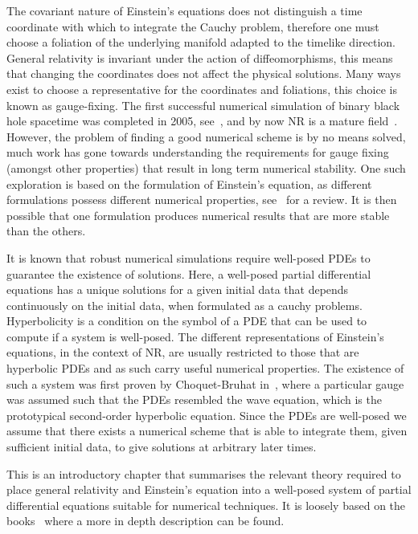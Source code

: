 \documentclass[10pt]{report}
\theoremstyle{definition}
\begin{document}
The covariant nature of Einstein's equations does not distinguish a time coordinate with which to integrate the Cauchy problem, therefore one must choose a foliation of the underlying manifold adapted to the timelike direction. General relativity is invariant under the action of diffeomorphisms, this means that changing the coordinates does not affect the physical solutions. Many ways exist to choose a representative for the coordinates and foliations, this choice is known as gauge-fixing. The first successful numerical simulation of binary black hole spacetime was completed in 2005, see~\cite{Evolution_of_Bi_Pretor_2005}, and by now NR is a mature field~\cite{NumericalRelatBaumga2010}. However, the problem of finding a good numerical scheme is by no means solved, much work has gone towards understanding the requirements for gauge fixing (amongst other properties) that result in long term numerical stability. One such exploration is based on the formulation of Einstein's equation, as different formulations possess different numerical properties, see~\cite{Formulations_of_Shinka_2008} for a review. It is then possible that one formulation produces numerical results that are more stable than the others.


It is known that robust numerical simulations require well-posed PDEs to guarantee the existence of solutions. Here, a well-posed partial differential equations has a unique solutions for a given initial data that depends continuously on the initial data, when formulated as a cauchy problems. Hyperbolicity is a condition on the symbol of a PDE that can be used to compute if a system is well-posed.  The different representations of Einstein's equations, in the context of NR, are usually restricted to those that are hyperbolic PDEs and as such carry useful numerical properties. The existence of such a system was first proven by Choquet-Bruhat in~\cite{Hyperb1+3YvonneTommaso1983}, where a particular gauge was assumed such that the PDEs resembled the wave equation, which is the prototypical second-order hyperbolic equation. Since the PDEs are well-posed we assume that there exists a numerical scheme that is able to integrate them, given sufficient initial data, to give solutions at arbitrary later times.

This is an introductory chapter that summarises the relevant theory required to place general relativity and Einstein's equation into a well-posed system of partial differential equations suitable for numerical techniques. It is loosely based on the books~\cite{AlcubierreMiguelIntro3+12008,NumericalRelatBaumga2010} where a more in depth description can be found.
\end{document}
